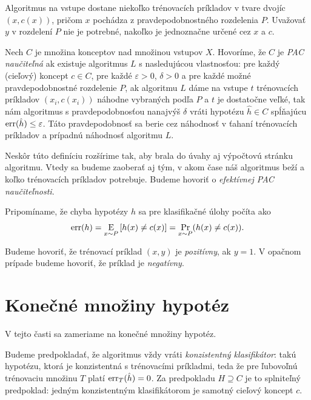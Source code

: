 Algoritmus na vstupe dostane niekoľko trénovacích príkladov v tvare dvojíc
$(x, c(x))$, pričom $x$ pochádza z pravdepodobnostného rozdelenia $P$.
Uvažovať $y$ v rozdelení $P$ nie je potrebné, nakoľko je jednoznačne
určené cez $x$ a $c$.

\begin{definition}
  Nech $C$ je množina konceptov nad množinou vstupov $X$. Hovoríme, že
  $C$ je \emph{PAC naučiteľná} ak existuje algoritmus $L$ s nasledujúcou
  vlastnosťou: pre každý (cieľový) koncept $c \in C$, pre každé
  $\varepsilon > 0$, $\delta > 0$ a pre každé možné pravdepodobnostné
  rozdelenie $P$, ak algoritmu $L$ dáme na vstupe $t$ trénovacích
  príkladov $(x_i, c(x_i))$ náhodne vybraných podľa $P$ a $t$ je
  dostatočne veľké, tak nám algoritmus s pravdepodobnosťou nanajvýš
  $\delta$ vráti hypotézu $\hat{h} \in C$ spĺňajúcu $\mathrm{err}(\hat{h}) \leq \varepsilon$.
  Táto pravdepodobnosť sa berie cez náhodnosť v ťahaní trénovacích
  príkladov a prípadnú náhodnosť algoritmu $L$.
\end{definition}
\begin{remark}
  Neskôr túto definíciu rozšírime tak, aby brala do úvahy aj výpočtovú
  stránku algoritmu. Vtedy sa budeme zaoberať aj tým, v akom čase náš
  algoritmus beží a koľko trénovacích príkladov potrebuje. Budeme
  hovoriť o \emph{efektívnej PAC naučiteľnosti}.
\end{remark}
\begin{remark}
  Pripomíname, že chyba hypotézy $h$ sa pre klasifikačné úlohy počíta
  ako
  $$\mathrm{err}(h) = \operatorname*{\mathrm{E}}_{x \sim P} \left[ h(x) \neq c(x) \right] = \operatorname*{\mathrm{Pr}}_{x \sim P}( h(x) \neq c(x) ).$$
\end{remark}

Budeme hovoriť, že trénovací príklad $(x, y)$ je \emph{pozitívny},
ak $y = 1$. V opačnom prípade budeme hovoriť, že príklad je
\emph{negatívny}.




\section{Konečné množiny hypotéz}

V tejto časti sa zameriame na konečné množiny hypotéz.

Budeme predpokladať, že algoritmus vždy vráti \emph{konzistentný
klasifikátor}: takú hypotézu, ktorá je konzistentná s trénovacími
príkladmi, teda že pre ľubovoľnú trénovaciu množinu $T$ platí
$\mathrm{err}_T(\hat{h}) = 0$. Za predpokladu $H \supseteq C$ je to
splniteľný predpoklad: jedným konzistentným klasifikátorom je
samotný cieľový koncept $c$.



